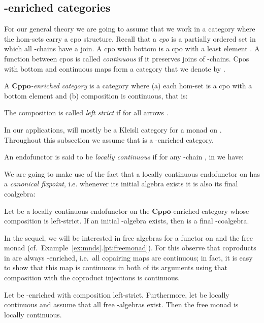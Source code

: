 \documentclass[oribibl,envcountsame,envcountsect,runningheads]{llncs}
\newcommand{\cat}[1]{\ensuremath{\mathbf{#1}}}
\newcommand{\cppo}{\cat{Cppo}}
\renewcommand{\>}{\rangle}
\begin{document}
\subsection{-enriched categories}
\label{sec:cppo}

For our general theory we are going to assume that we work in a
category where the hom-sets carry a cpo structure. Recall that a
\emph{cpo} is a partially ordered set in which all -chains
have a join. A cpo with bottom is a cpo with a least element . A
function between cpos is called \emph{continuous} if it preserves
joins of -chains. Cpos with bottom and continuous maps form a category
that we denote by .

A \emph{\cppo-enriched category}  is a category where (a)
each hom-set  is a cpo with a bottom element  and
(b) composition is continuous, that is:

The composition is called \emph{left strict} if  for all arrows 
.

In our applications,  will mostly be a Kleisli category for a
monad on . Throughout this subsection we assume
that  is a -enriched category.

An endofunctor  is said to be \emph{locally
  continuous} if for any -chain ,  in  we have:


We are going to make use of the fact that a locally continuous endofunctor
 on  has a \emph{canonical fixpoint}, i.e. whenever its
initial algebra exists it is also its final coalgebra:

\begin{theorem}\label{thm:Freyd}
 Let  be a locally continuous endofunctor on the \cppo-enriched category  whose composition is left-strict.
 If an initial -algebra  exists,
 then  is a final -coalgebra.
\end{theorem}


In the sequel, we will be interested in free algebras for a
functor  on  and the free monad 
(cf.~Example~\ref{ex:mnds}.\ref{pt:freemonad}). For this observe that coproducts in  are always -enriched, i.e.~all copairing maps  are continuous; in fact, it is easy to show that this map is continuous in both of its arguments using that composition with the coproduct injections is continuous.

\newcommand{\lemHstar}{  Let  be -enriched with composition left-strict.
  Furthermore, let  be locally continuous and assume that all
  free -algebras exist. Then the free monad  is locally continuous.
}

\begin{proposition}
  \label{lem:Hstar}
\lemHstar
  \end{proposition}
\end{document}
